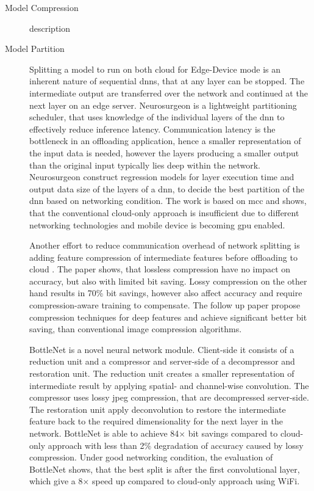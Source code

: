 \begin{description}
	\item[Model Compression] description \cite{courbariaux_binaryconnect:_2015}
	\item[Model Partition] Splitting a model to run on both cloud for Edge-Device mode is an inherent nature of sequential \gls{dnn}s, that at any layer can be stopped. The intermediate output are transferred over the network and continued at the next layer on an edge server. Neurosurgeon \cite{kang_neurosurgeon:_2017} is a lightweight partitioning scheduler, that uses knowledge of the individual layers of the \gls{dnn} to effectively reduce inference latency. Communication latency is the bottleneck in an offloading application, hence a smaller representation of the input data is needed, however the layers producing a smaller output than the original input typically lies deep within the network. Neurosurgeon construct regression models for layer execution time and  output data size of the layers of a \gls{dnn}, to decide the best partition of the \gls{dnn} based on networking condition. The work is based on \gls{mcc} and shows, that the conventional cloud-only approach is insufficient due to different networking technologies and mobile device is becoming \gls{gpu} enabled. 
	
	Another effort to reduce communication overhead of network splitting is adding feature compression of intermediate features before offloading to cloud \cite{choi_deep_2018}. The paper shows, that lossless compression have no impact on accuracy, but also with limited bit saving. Lossy compression on the other hand results in 70\% bit savings, however also affect accuracy and require compression-aware training to compensate. The follow up paper \cite{choi_near-lossless_2018} propose compression techniques for deep features and achieve significant better bit saving, than conventional image compression algorithms. 
	
	BottleNet \cite{eshratifar_bottlenet:_2019} is a novel neural network module. Client-side it consists of a reduction unit and a compressor and server-side of a decompressor and restoration unit. The reduction unit creates a smaller representation of intermediate result by applying spatial- and channel-wise convolution. The compressor uses lossy \gls{jpeg} compression, that are decompressed server-side. The restoration unit apply deconvolution to restore the intermediate feature back to the required dimensionality for the next layer in the network. BottleNet is able to achieve 84$\times$ bit savings compared to cloud-only approach with less than 2\% degradation of accuracy caused by lossy compression. Under good networking condition, the evaluation of BottleNet shows, that the best split is after the first convolutional layer, which give a 8$\times$ speed up compared to cloud-only approach using WiFi.
	

\end{description}

